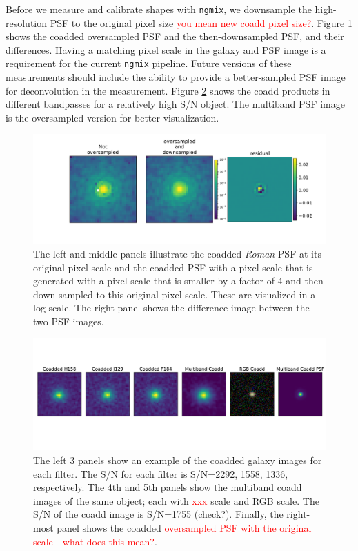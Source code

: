 \documentclass[fleqn,usenatbib]{mnras}
\begin{document}
Before we measure and calibrate shapes with \texttt{ngmix}, we downsample the high-resolution PSF to the original pixel size \textcolor{red}{you mean new coadd pixel size?}. Figure \ref{fig:coadd_oversample_res} shows the coadded oversampled PSF and the then-downsampled PSF, and their differences. Having a matching pixel scale in the galaxy and PSF image is a requirement for the current \texttt{ngmix} pipeline. Future versions of these measurements should include the ability to provide a better-sampled PSF image for deconvolution in the measurement. Figure \ref{fig:single_to_coadd_rgb} shows the coadd products in different bandpasses for a relatively high S/N object. The multiband PSF image is the oversampled version for better visualization. 


\begin{figure}
	\includegraphics[width=\columnwidth]{figure3.pdf}
    \vspace*{-5mm}
    \caption{The left and middle panels illustrate the coadded \emph{Roman} PSF at its original pixel scale and the coadded PSF with a pixel scale that is generated with a pixel scale that is smaller by a factor of 4 and then down-sampled to this original pixel scale. These are visualized in a log scale. The right panel shows the difference image between the two PSF images. }
    \label{fig:coadd_oversample_res}
\end{figure}


\begin{figure}
	\includegraphics[width=\textwidth]{figure4_og.pdf}
    \vspace*{-20mm}
    \caption{The left 3 panels show an example of the coadded galaxy images for each filter. The S/N for each filter is S/N=2292, 1558, 1336, respectively. The 4th and 5th panels show the multiband coadd images of the same object; each with \textcolor{red}{xxx} scale and RGB scale. The S/N of the coadd image is S/N=1755 (check?). Finally, the right-most panel shows the coadded \textcolor{red}{oversampled PSF with the original scale - what does this mean?}.}
    \label{fig:single_to_coadd_rgb}
\end{figure}
\end{document}
